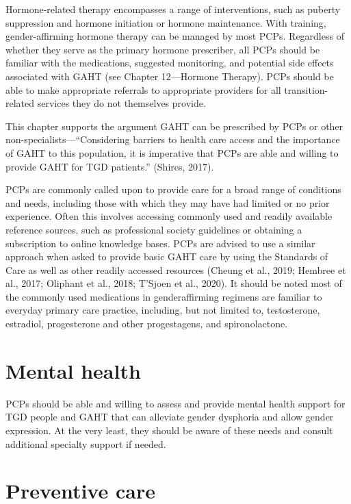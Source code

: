 \documentclass[
]{book}
\begin{document}
Hormone-related therapy encompasses a range
of interventions, such as puberty suppression and
hormone initiation or hormone maintenance.
With training, gender-affirming hormone therapy
can be managed by most PCPs. Regardless of
whether they serve as the primary hormone prescriber, all PCPs should be familiar with the
medications, suggested monitoring, and potential
side effects associated with GAHT (see Chapter
12---Hormone Therapy). PCPs should be able to
make appropriate referrals to appropriate providers for all transition-related services they do not
themselves provide.

This chapter supports the argument GAHT can
be prescribed by PCPs or other
non-specialists---``Considering barriers to health
care access and the importance of GAHT to this
population, it is imperative that PCPs are able
and willing to provide GAHT for TGD patients.''
(Shires, 2017).

PCPs are commonly called upon to provide
care for a broad range of conditions and needs,
including those with which they may have had
limited or no prior experience. Often this involves
accessing commonly used and readily available
reference sources, such as professional society
guidelines or obtaining a subscription to online
knowledge bases. PCPs are advised to use a similar approach when asked to provide basic GAHT
care by using the Standards of Care as well as
other readily accessed resources (Cheung et al.,
2019; Hembree et al., 2017; Oliphant et al., 2018;
T'Sjoen et al., 2020). It should be noted most of
the commonly used medications in genderaffirming regimens are familiar to everyday primary care practice, including, but not limited to,
testosterone, estradiol, progesterone and other
progestagens, and spironolactone.

\hypertarget{mental-health}{%
\section*{Mental health}\label{mental-health}}

PCPs should be able and willing to assess and
provide mental health support for TGD
people and GAHT that can alleviate gender
dysphoria and allow gender expression. At the
very least, they should be aware of these
needs and consult additional specialty support
if needed.

\hypertarget{preventive-care}{%
\section*{Preventive care}\label{preventive-care}}
\end{document}

